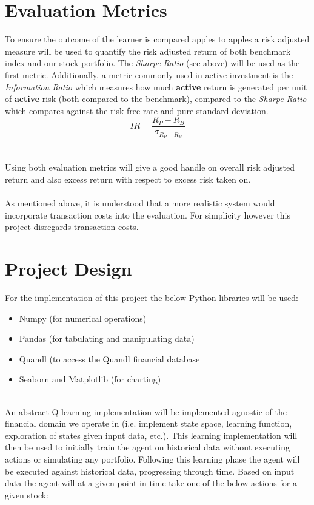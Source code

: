 \documentclass[dvips,12pt]{article}
\begin{document}
\section{Evaluation Metrics}
To ensure the outcome of the learner is compared apples to apples a risk adjusted measure will be used to quantify the risk adjusted return of both benchmark index and our stock portfolio. The \emph{Sharpe Ratio} (see above) will be used as the first metric. Additionally, a metric commonly used in active investment is the \emph{Information Ratio} which measures how much  \textbf{active} return is generated per unit of \textbf{active} risk (both compared to the benchmark), compared to the \emph{Sharpe Ratio} which compares against the risk free rate and pure standard deviation. 
\begin{equation}
	IR = \frac{R_P - R_B}{\sigma_{R_P - R_B}}
\end{equation}
~\\\\
Using both evaluation metrics will give a good handle on overall risk adjusted return and also excess return with respect to excess risk taken on.
\\\\
As mentioned above, it is understood that a more realistic system would incorporate transaction costs into the evaluation. For simplicity however this project disregards transaction costs.

\section{Project Design}
For the implementation of this project the below Python libraries will be used:

\begin{itemize}
	\item Numpy (for numerical operations)
	\item Pandas (for tabulating and manipulating data)
	\item Quandl (to access the Quandl financial database
	\item Seaborn and Matplotlib (for charting)
\end{itemize}
~\\
An abstract Q-learning implementation will be implemented agnostic of the financial domain we operate in (i.e. implement state space, learning function, exploration of states given input data, etc.). This learning implementation will then be used to initially train the agent on historical data without executing actions or simulating any portfolio. Following this learning phase the agent will be executed against historical data, progressing through time. Based on input data the agent will at a given point in time take one of the below actions for a given stock:
\end{document}
